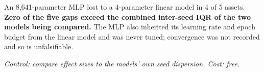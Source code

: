 An 8,641-parameter MLP lost to a 4-parameter linear model in 4 of 5 assets. \textbf{Zero of the five
gaps exceed the combined inter-seed IQR of the two models being compared.} The MLP also
inherited its learning rate and epoch budget from the linear model and was never tuned;
convergence was not recorded and so is unfalsifiable.

\emph{Control: compare effect sizes to the models' own seed dispersion. Cost: free.}
